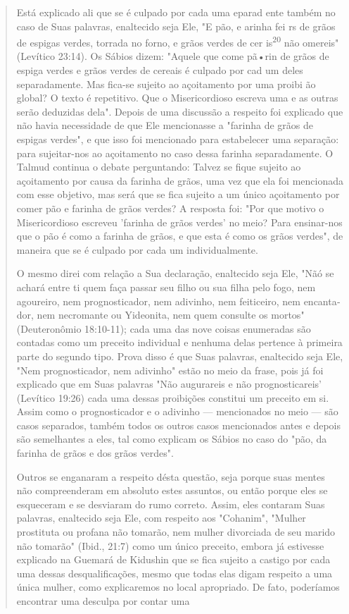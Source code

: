 \begin{quote}
Está explicado ali que se é culpado por cada uma eparad ente tam­bém no
caso de Suas palavras, enaltecido seja Ele, "E pão, e arinha fei rs de
grãos de espigas verdes, torrada no forno, e grãos verdes de cer
is\textsuperscript{20} não omereis" (Levítico 23:14). Os Sábios dizem:
"Aquele que come pã•rin de grãos de espiga verdes e grãos verdes de
cereais é culpado por cad um deles separada­mente. Mas fica-se sujeito
ao açoitamento por uma proibi ão global? O texto é repetitivo. Que o
Misericordioso escreva uma e as outras serão deduzidas de­la". Depois de
uma discussão a respeito foi explicado que não havia necessida­de de que
Ele mencionasse a "farinha de grãos de espigas verdes", e que isso foi
mencionado para estabelecer uma separação: para sujeitar-nos ao
açoitamento no caso dessa farinha separadamente. O Talmud continua o
debate perguntan­do: Talvez se fique sujeito ao açoitamento por causa da
farinha de grãos, uma vez que ela foi mencionada com esse objetivo, mas
será que se fica sujeito a um único açoitamento por comer pão e farinha
de grãos verdes? A resposta foi: "Por que motivo o Misericordioso
escreveu 'farinha de grãos verdes' no meio? Para ensinar-nos que o pão é
como a farinha de grãos, e que esta é como os grãos verdes", de maneira
que se é culpado por cada um individualmente.

O mesmo direi com relação a Sua declaração, enaltecido seja Ele, "Nãó se
achará entre ti quem faça passar seu filho ou sua filha pelo fogo, nem
agoureiro, nem prognosticador, nem adivinho, nem feiticeiro, nem
encanta­dor, nem necromante ou Yideonita, nem quem consulte os mortos"
(Deutero­nômio 18:10-11); cada uma das nove coisas enumeradas são
contadas como um preceito individual e nenhuma delas pertence à primeira
parte do segundo ti­po. Prova disso é que Suas palavras, enaltecido seja
Ele, "Nem prognosticador, nem adivinho" estão no meio da frase, pois já
foi explicado que em Suas pala­vras "Não augurareis e não
prognosticareis' (Levítico 19:26) cada uma dessas proibições constitui
um preceito em si. Assim como o prognosticador e o adi­vinho ---
mencionados no meio --- são casos separados, também todos os ou­tros
casos mencionados antes e depois são semelhantes a eles, tal como
expli­cam os Sábios no caso do "pão, da farinha de grãos e dos grãos
verdes".

Outros se enganaram a respeito désta questão, seja porque suas men­tes
não compreenderam em absoluto estes assuntos, ou então porque eles se
esqueceram e se desviaram do rumo correto. Assim, eles contaram Suas
pala­vras, enaltecido seja Ele, com respeito aos "Cohanim", "Mulher
prostituta ou profana não tomarão, nem mulher divorciada de seu marido
não tomarão" (Ibid., 21:7) como um único preceito, embora já estivesse
explicado na Guemará de Kidushin que se fica sujeito a castigo por cada
uma dessas desqualificações, mes­mo que todas elas digam respeito a uma
única mulher, como explicaremos no local apropriado. De fato, poderíamos
encontrar uma desculpa por contar uma


\end{quote}
